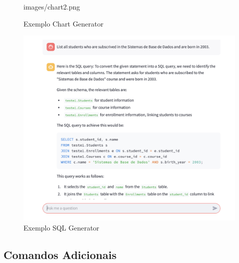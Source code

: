 \documentclass{article}
\begin{document}
\begin{figure}[!ht]
\begin{minipage}{0.3\linewidth}
        {images/chart2.png}
        \caption{Exemplo Chart Generator}
    \end{minipage}
    \hspace{0.01\linewidth} %
    \begin{minipage}{0.3\linewidth}
        \centering
        \includegraphics[width=\linewidth]
        {images/sql_generator1.png}
        \caption{Exemplo SQL Generator}
    \end{minipage}
\end{figure}

\subsection{Comandos Adicionais}
\end{document}
